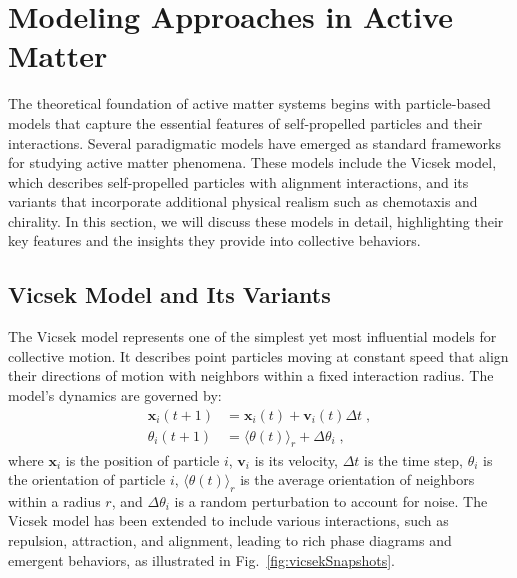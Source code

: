 \documentclass[a4paper, amsfonts, amssymb, amsmath, reprint, showkeys, showpacs, nofootinbib, twoside]{revtex4-2}
\begin{document}
\section{\label{sec:models}Modeling Approaches in Active Matter}

The theoretical foundation of active matter systems begins with particle-based models that capture the essential features of self-propelled particles and their interactions. Several paradigmatic models have emerged as standard frameworks for studying active matter phenomena. These models include the Vicsek model, which describes self-propelled particles with alignment interactions, and its variants that incorporate additional physical realism such as chemotaxis and chirality. In this section, we will discuss these models in detail, highlighting their key features and the insights they provide into collective behaviors.

\subsection{Vicsek Model and Its Variants}

The Vicsek model \cite{PhysRevLett.75.1226} represents one of the simplest yet most influential models for collective motion. It describes point particles moving at constant speed that align their directions of motion with neighbors within a fixed interaction radius. The model's dynamics are governed by:
\begin{subequations}
    \begin{align}
        \mathbf{x}_i\left( t+1 \right) &=\mathbf{x}_i\left( t \right) +\mathbf{v}_i\left( t \right) \Delta t\;,
        \\
        \theta_i \left( t+1 \right) &=\langle \theta \left( t \right) \rangle _r+\Delta \theta_i \;,
    \end{align}
\end{subequations}
where $\mathbf{x}_i$ is the position of particle $i$, $\mathbf{v}_i$ is its velocity, $\Delta t$ is the time step, $\theta_i$ is the orientation of particle $i$, $\langle \theta \left( t \right) \rangle _r$ is the average orientation of neighbors within a radius $r$, and $\Delta \theta_i$ is a random perturbation to account for noise. The Vicsek model has been extended to include various interactions, such as repulsion, attraction, and alignment, leading to rich phase diagrams and emergent behaviors, as illustrated in Fig.~\ref{fig:vicsekSnapshots}.
\end{document}
